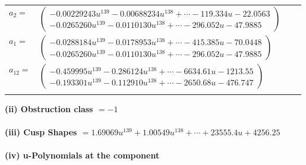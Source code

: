 \documentclass[1p]{elsarticle_modified}
\theoremstyle{definition}
\begin{document}
\begin{tabular}{m{7pt} m{180pt} m{7pt} m{180pt} }
\flushright $a_{2}=$&$\begin{pmatrix}-0.00229243 u^{139}-0.00688234 u^{138}+\cdots-119.334 u-22.0563\\-0.0265260 u^{139}-0.0110130 u^{138}+\cdots-296.052 u-47.9885\end{pmatrix}$ \\
\flushright $a_{1}=$&$\begin{pmatrix}-0.0288184 u^{139}-0.0178953 u^{138}+\cdots-415.385 u-70.0448\\-0.0265260 u^{139}-0.0110130 u^{138}+\cdots-296.052 u-47.9885\end{pmatrix}$ \\
\flushright $a_{12}=$&$\begin{pmatrix}-0.459995 u^{139}-0.286124 u^{138}+\cdots-6634.61 u-1213.55\\-0.193301 u^{139}-0.112910 u^{138}+\cdots-2650.68 u-476.747\end{pmatrix}$\\&\end{tabular}
\flushleft \textbf{(ii) Obstruction class $= -1$}\\~\\
\flushleft \textbf{(iii) Cusp Shapes $= 1.69069 u^{139}+1.00549 u^{138}+\cdots+23555.4 u+4256.25$}\\~\\
\newpage\renewcommand{\arraystretch}{1}
\flushleft \textbf{(iv) u-Polynomials at the component}\newline \\
\end{document}
